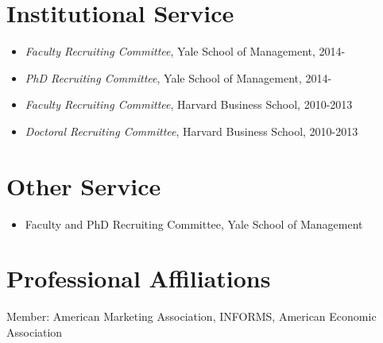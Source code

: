 \documentclass[margin, line, centered, 10pt]{res}
\begin{document}
\begin{resume}
\section{\sc Institutional Service}
\begin{itemize}
\item \textit{Faculty Recruiting Committee}, Yale School of Management, 2014-
\item \textit{PhD Recruiting Committee}, Yale School of Management, 2014-
\item \textit{Faculty Recruiting Committee},  Harvard Business School, 2010-2013
\item \textit{Doctoral Recruiting Committee}, Harvard Business School, 2010-2013
\end{itemize}

\section{\sc Other Service}
\begin{itemize}
\item Faculty and PhD Recruiting Committee, Yale School of Management
\end{itemize}

\section{\sc Professional Affiliations}%
Member: American Marketing Association, INFORMS, American Economic Association


\end{resume}
\end{document}
